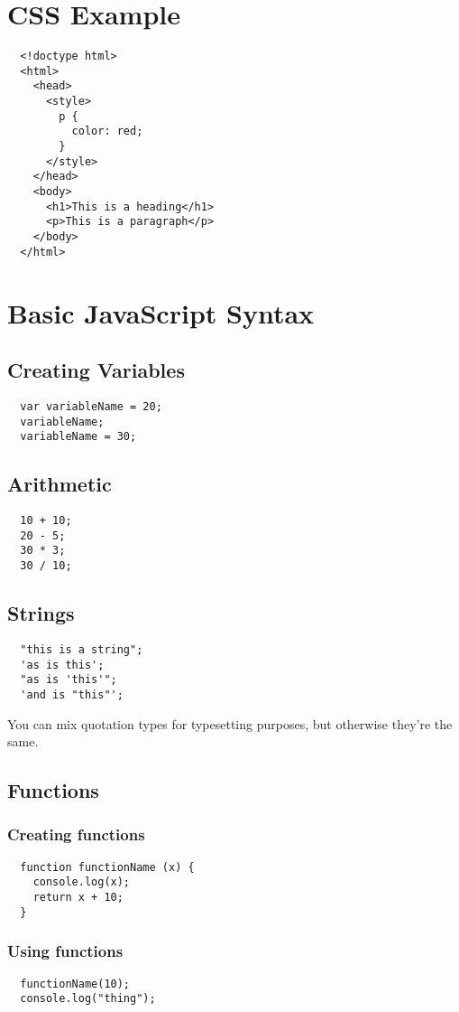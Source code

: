 \documentclass[letterpage,foldmark,10pt]{leaflet}
\begin{document}
\section{CSS Example}
\begin{verbatim}
  <!doctype html>
  <html>
    <head>
      <style>
        p {
          color: red;
        }
      </style>
    </head>
    <body>
      <h1>This is a heading</h1>
      <p>This is a paragraph</p>
    </body>
  </html>
\end{verbatim}
\section{Basic JavaScript Syntax}
\subsection{Creating Variables}
\begin{verbatim}
  var variableName = 20;
  variableName;
  variableName = 30;
\end{verbatim}
\subsection{Arithmetic}
\begin{verbatim}
  10 + 10;
  20 - 5;
  30 * 3;
  30 / 10;
\end{verbatim}
\subsection{Strings}
\begin{verbatim}
  "this is a string";
  'as is this';
  "as is 'this'";
  'and is "this"';
\end{verbatim}
\begin{framed}
  You can mix quotation types for typesetting purposes, but otherwise they're the same.
\end{framed}
\subsection{Functions}
\subsubsection{Creating functions}
\begin{verbatim}
  function functionName (x) {
    console.log(x);
    return x + 10;
  }
\end{verbatim}
\subsubsection{Using functions}
\begin{verbatim}
  functionName(10);
  console.log("thing");
\end{verbatim}
\end{document}
